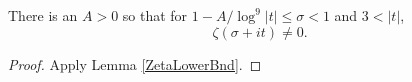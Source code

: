 \begin{lemma}[ZetaZeroFree9]
\label{ZetaZeroFree9}
\leanok
There is an $A>0$ so that for $1-A/\log^9 |t| \le \sigma < 1$ and $3 < |t|$,
  $$
  \zeta(\sigma+it) \ne 0.
  $$
\end{lemma}
\begin{proof}
\leanok
Apply Lemma \ref{ZetaLowerBnd}.
\end{proof}
